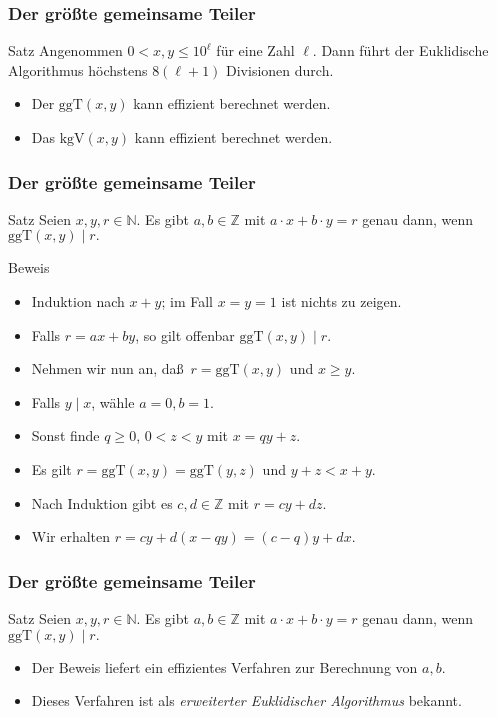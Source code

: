 \documentclass{beamer}
\renewcommand{\emph}[1]{{\textcolor{solarizedRed}{\itshape #1}}}
\newcommand\NN{\mathbb N}
\newcommand\ZZ{\mathbb Z}
\newcommand{\ggt}{\mathrm{ggT}}
\newcommand{\kgv}{\mathrm{kgV}}
\renewcommand{\ae}{\"a}
\renewcommand{\oe}{\"o}
\newcommand{\ue}{\"u}
\begin{document}
\begin{frame}\frametitle{Der gr\oe\ss te gemeinsame Teiler}
	\begin{block}{Satz}
		Angenommen $0<x,y\leq10^\ell$ f\ue r eine Zahl $\ell$.
		Dann f\ue hrt der Euklidische Algorithmus h\oe chstens $8(\ell+1)$ Divisionen durch.
	\end{block}
	\begin{block}{}
		\begin{itemize}
			\item Der $\ggt(x,y)$ kann effizient berechnet werden.
			\item Das $\kgv(x,y)$ kann effizient berechnet werden.
		\end{itemize}
	\end{block}
\end{frame}

\begin{frame}\frametitle{Der gr\oe\ss te gemeinsame Teiler}
	\begin{block}{Satz}
		Seien $x,y,r\in\NN$.
		Es gibt $a,b\in\ZZ$ mit $a\cdot x+b\cdot y=r$ genau dann, wenn $\ggt(x,y)\mid r.$
	\end{block}
	\begin{block}{Beweis}
		\begin{itemize}
			\item Induktion nach $x+y$; im Fall $x=y=1$ ist nichts zu zeigen.
			\item Falls $r=ax+by$, so gilt offenbar $\ggt(x,y)\mid r$.
			\item Nehmen wir nun an, da\ss\ $r=\ggt(x,y)$ und $x\geq y$.
			\item Falls $y\mid x$, w\ae hle $a=0,b=1$.
			\item Sonst finde $q\geq0$, $0<z<y$ mit $x=qy+z$.
			\item Es gilt $r=\ggt(x,y)=\ggt(y,z)$ und $y+z<x+y$.
			\item Nach Induktion gibt es $c,d\in\ZZ$ mit $r=cy+dz$.
			\item Wir erhalten $r=cy+d(x-qy)=(c-q)y+dx$.
		\end{itemize}
	\end{block}
\end{frame}

\begin{frame}\frametitle{Der gr\oe\ss te gemeinsame Teiler}
	\begin{block}{Satz}
		Seien $x,y,r\in\NN$.
		Es gibt $a,b\in\ZZ$ mit $a\cdot x+b\cdot y=r$ genau dann, wenn $\ggt(x,y)\mid r.$
	\end{block}
	\begin{block}{}
		\begin{itemize}
			\item Der Beweis liefert ein effizientes Verfahren zur Berechnung von $a,b$.
			\item Dieses Verfahren ist als \emph{erweiterter Euklidischer Algorithmus} bekannt.
		\end{itemize}
	\end{block}
\end{frame}
\end{document}
